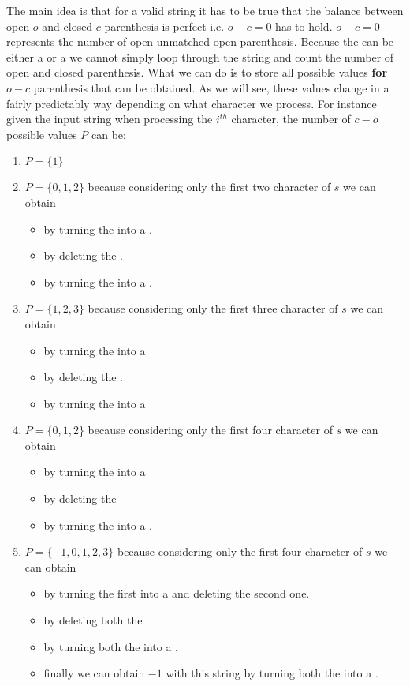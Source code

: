 The main idea  is that for a valid string it has to be true that the balance between open $o$ and closed $c$ parenthesis is perfect i.e. $o-c=0$ has to hold. $o-c=0$ represents the number of open unmatched open parenthesis. Because the \fbox{*} can be either a \fbox{(} or a \fbox{)} we cannot simply loop through the string and count the number of open and closed parenthesis. What we can do is to store all possible values \textbf{for} $o-c$ parenthesis that can be obtained. As we will see,  these values change in a fairly predictably way depending on what character we process.
For instance given the input string  when processing the $i^{th}$ character, the number of $c-o$ possible values $P$ can be:
\begin{enumerate}
	\item $P=\{1\}$ 
	\item $P=\{0,1,2\}$ because considering only the first two character of $s$ \fbox{(*} we can obtain 
	\begin{itemize}
		\item  \fbox{((} by turning the \fbox{*} into a \fbox{(}.
		\item \fbox{(} by deleting the \fbox{*}.
		\item \fbox{()} by turning the \fbox{*} into a \fbox{)}.
	\end{itemize}
	\item $P=\{1,2,3\}$ because considering only the first three character of $s$ \fbox{(*(} we can obtain
	\begin{itemize}
		\item \fbox{(((} by turning the \fbox{*} into a \fbox{(}
		\item \fbox{(\aspace(} by deleting the \fbox{*}.
		\item \fbox{(((} by turning the \fbox{*} into a \fbox{(}
	\end{itemize}
	\item $P=\{0,1,2\}$ because considering only the first four character of $s$ \fbox{(*()} we can obtain 
	\begin{itemize}
		\item \fbox{()()} by turning the \fbox{*} into a \fbox{)}
		\item \fbox{(\aspace()} by deleting the \fbox{*}
		\item \fbox{((()} by turning the \fbox{*} into a \fbox{(}.
	\end{itemize}
	\item $P=\{-1,0,1,2,3\}$ because considering only the first four character of $s$ \fbox{(*()*} we can obtain 
	\begin{itemize}
		\item \fbox{()()\aspace} by turning the first \fbox{*} into a \fbox{)} and deleting the second one.
		\item \fbox{(\aspace()\aspace} by deleting both the \fbox{*}
		\item \fbox{((()(} by turning both the \fbox{*} into a \fbox{(}.
		\item finally we can obtain $-1$ with this string \fbox{((()(} by turning both the \fbox{*} into a \fbox{)}.
	\end{itemize}
\end{enumerate}
